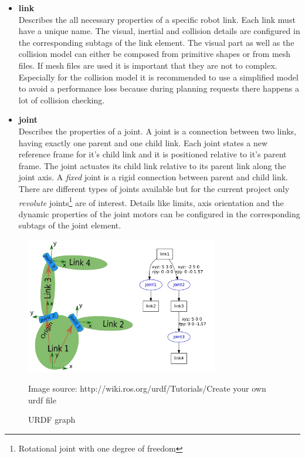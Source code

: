\begin{itemize}

\item \textbf{link} \\
Describes the all necessary properties of a specific robot link. Each link must have a unique name. The visual, inertial and collision details are configured in the corresponding subtags of the link element. The visual part as well as the collision model can either be composed from primitive shapes
or from mesh files. If mesh files are used it is important that they are not to complex. Especially for the collision model it is recommended to use a simplified model to avoid a performance loss because during planning requests there happens a lot of collision checking.

\item \textbf{joint} \\
Describes the properties of a joint. A joint is a connection between two links, having exactly one parent and one child link. Each joint states a new reference frame for it's child link and it is positioned relative to it's parent frame. The joint actuates its child link relative to its parent link along the joint axis. A \emph{fixed} joint is a rigid connection between parent and child link. There are different types of joints available but for the current project only \emph{revolute} joints\footnote{Rotational joint with one degree of freedom} are of interest. Details like limits, axis orientation and the dynamic properties of the joint motors can be configured in the corresponding subtags of the joint element.

\end{itemize}
\begin{figure}[ht]
	\centering
  	\includegraphics[width=0.75\textwidth]{images/urdf_chain.jpg}
	\caption[URDF graph]{URDF graph}
	{\scriptsize Image source: http://wiki.ros.org/urdf/Tutorials/Create your own urdf file}
	\label{fig:urdf_graph}
\end{figure}
